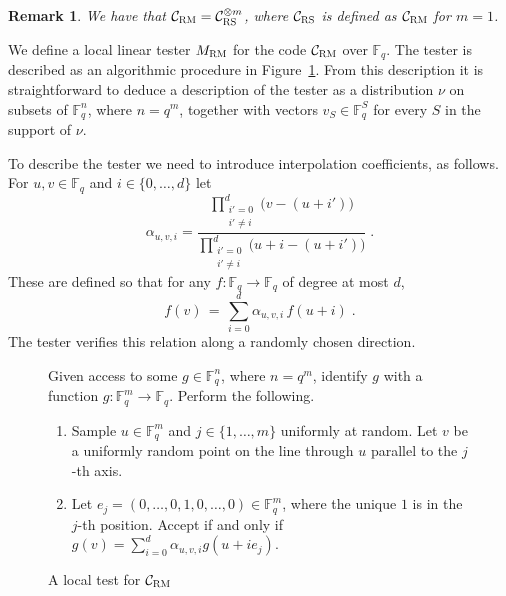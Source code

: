 \documentclass[11pt]{article}
\newtheorem{theorem}{Theorem}[section]
\newtheorem{remark}[theorem]{Remark}
\theoremstyle{definition}
\newcommand{\code}{\mathcal{C}}
\newcommand{\F}{\ensuremath{\mathbb{F}}}
\newcommand{\mC}{\ensuremath{\mathcal{C}}}
\newcommand{\RM}{\ensuremath{\textsc{RM}}}
\newcommand{\RS}{\ensuremath{\textsc{RS}}}
\DeclareMathOperator{\poly}{poly}
\newcommand{\eps}{\varepsilon}
\newenvironment{gamespec}{
  \begin{mdframed}[style=figstyle]}{
  \end{mdframed}}
\begin{document}
\begin{remark}\label{rk:tensor-code}
We have that $\mC_\RM = \mC_\RS^{\otimes m}$, where $\mC_\RS$ is defined as $\mC_\RM$ for $m=1$.
\end{remark}


We define a local linear tester $M_{\RM}$ for the code $\mC_\RM$ over $\F_q$. The tester is described as an algorithmic procedure in Figure~\ref{fig:RM-tester}. From this description it is straightforward to deduce a description of the tester as a distribution $\nu$ on subsets of $\F_q^n$, where $n=q^m$, together with vectors $v_S\in \F_q^S$ for every $S$ in the support of $\nu$. 

To describe the tester we need to introduce interpolation coefficients, as follows. For $u,v\in \F_q$ and $i\in\{0,\ldots,d\}$ let 
\begin{equation}\label{eq:interp-coeff}
 \alpha_{u,v,i} = \frac{\prod_{\substack{i'=0\\i'\neq i}}^{d} \big(v-(u+i')\big)}{\prod_{\substack{i'=0\\i'\neq i}}^{d} \big(u+i-(u+i')\big)}\;.
\end{equation}
These are defined so that for any $f:\F_q\to\F_q$ of degree at most $d$, 
\[ f(v)\,=\, \sum_{i=0}^{d} \alpha_{u,v,i} \, f(u+i)\;.\]
The tester verifies this relation along a randomly chosen direction. 


\begin{figure}[!htbp]
  \centering
  \begin{gamespec}
Given access to some $g\in \F_q^n$, where $n=q^m$, identify $g$ with a function $g:\F_q^m\to \F_q$. Perform the following.
\begin{enumerate}
	\item Sample	$u\in \F_q^m$ and $j\in \{1,\ldots,m\}$ uniformly at random. Let $v$ be a uniformly random point on the line through $u$ parallel to the $j$-th axis.  
	\item Let $e_j=(0,\ldots,0,1,0,\ldots,0)\in \F_q^m$, where the unique $1$ is in the $j$-th position. Accept if and only if $g(v) = \sum_{i=0}^{d} \alpha_{u,v,i} g(u+ie_j)$.  
    \end{enumerate}
  \end{gamespec}
  \caption{A local test for $\code_{\RM}$}
  \label{fig:RM-tester}
\end{figure}



\end{document}
